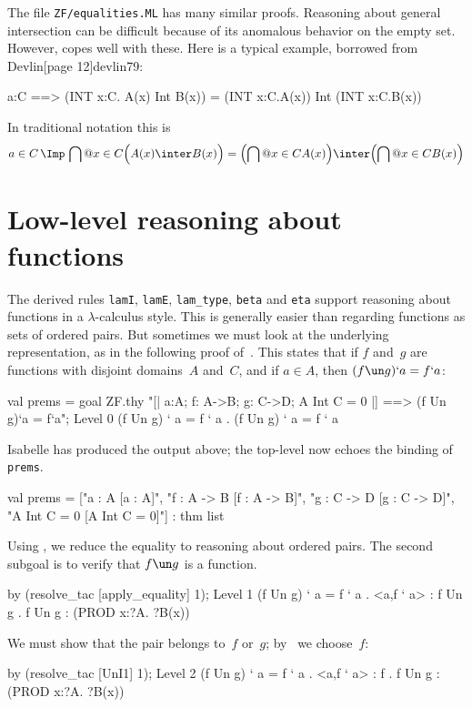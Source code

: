 The file {\tt ZF/equalities.ML} has many similar proofs.
Reasoning about general intersection can be difficult because of its anomalous
behavior on the empty set.  However,  copes well with
these.  Here is a typical example, borrowed from Devlin[page 12]{devlin79}:
\begin{ttbox}
a:C ==> (INT x:C. A(x) Int B(x)) = (INT x:C.A(x)) Int (INT x:C.B(x))
\end{ttbox}
In traditional notation this is
\[ a\in C \,\Imp\, \bigcap@{x\in C} \Bigl(A(x) \inter B(x)\Bigr) =        
       \Bigl(\bigcap@{x\in C} A(x)\Bigr)  \inter  
       \Bigl(\bigcap@{x\in C} B(x)\Bigr)  \]

\section{Low-level reasoning about functions}
The derived rules {\tt lamI}, {\tt lamE}, {\tt lam_type}, {\tt beta}
and {\tt eta} support reasoning about functions in a
$\lambda$-calculus style.  This is generally easier than regarding
functions as sets of ordered pairs.  But sometimes we must look at the
underlying representation, as in the following proof
of~.  This states that if $f$ and~$g$ are
functions with disjoint domains~$A$ and~$C$, and if $a\in A$, then
$(f\un g)`a = f`a$:
\begin{ttbox}
val prems = goal ZF.thy
    "[| a:A;  f: A->B;  g: C->D;  A Int C = 0 |] ==>  \ttback
\ttback    (f Un g)`a = f`a";
{\out Level 0}
{\out (f Un g) ` a = f ` a}
{. (f Un g) ` a = f ` a}
\end{ttbox}
Isabelle has produced the output above; the \ML{} top-level now echoes the
binding of {\tt prems}.
\begin{ttbox}
{\out val prems = ["a : A  [a : A]",}
{\out              "f : A -> B  [f : A -> B]",}
{\out              "g : C -> D  [g : C -> D]",}
{\out              "A Int C = 0  [A Int C = 0]"] : thm list}
\end{ttbox}
Using , we reduce the equality to reasoning about
ordered pairs.  The second subgoal is to verify that $f\un g$ is a function.
\begin{ttbox}
by (resolve_tac [apply_equality] 1);
{\out Level 1}
{\out (f Un g) ` a = f ` a}
{. <a,f ` a> : f Un g}
{. f Un g : (PROD x:?A. ?B(x))}
\end{ttbox}
We must show that the pair belongs to~$f$ or~$g$; by~ we
choose~$f$:
\begin{ttbox}
by (resolve_tac [UnI1] 1);
{\out Level 2}
{\out (f Un g) ` a = f ` a}
{. <a,f ` a> : f}
{. f Un g : (PROD x:?A. ?B(x))}
\end{ttbox}
